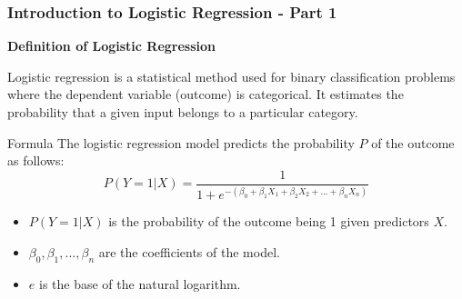 \documentclass[aspectratio=169]{beamer}
\begin{document}
\begin{frame}[fragile]
    \frametitle{Introduction to Logistic Regression - Part 1}
    \textbf{Definition of Logistic Regression}
    
    Logistic regression is a statistical method used for binary classification problems where the dependent variable (outcome) is categorical. It estimates the probability that a given input belongs to a particular category.

    \begin{block}{Formula}
        The logistic regression model predicts the probability \( P \) of the outcome as follows:
        \[
        P(Y=1 | X) = \frac{1}{1 + e^{-(\beta_0 + \beta_1X_1 + \beta_2X_2 + ... + \beta_nX_n)}}
        \]
    \end{block}

    \begin{itemize}
        \item \( P(Y=1 | X) \) is the probability of the outcome being 1 given predictors \( X \).
        \item \( \beta_0, \beta_1, ... , \beta_n \) are the coefficients of the model.
        \item \( e \) is the base of the natural logarithm.
    \end{itemize}
\end{frame}
\end{document}
